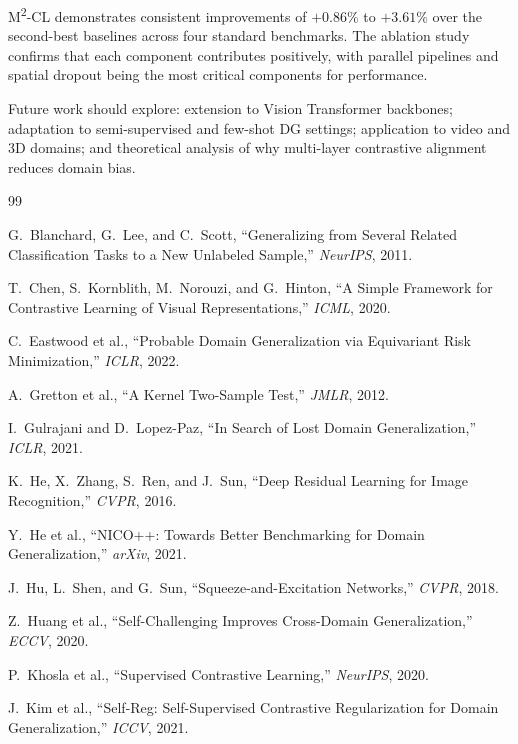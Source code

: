 \documentclass[12pt,a4paper]{article}
\begin{document}
M\textsuperscript{2}-CL demonstrates consistent improvements of $+0.86\%$ to $+3.61\%$
over the second-best baselines across four standard benchmarks. The ablation study
confirms that each component contributes positively, with parallel pipelines and spatial
dropout being the most critical components for performance.

Future work should explore: extension to Vision Transformer backbones; adaptation to
semi-supervised and few-shot DG settings; application to video and 3D domains; and
theoretical analysis of why multi-layer contrastive alignment reduces domain bias.

\newpage
\begin{thebibliography}{99}

G.~Blanchard, G.~Lee, and C.~Scott,
``Generalizing from Several Related Classification Tasks to a New Unlabeled Sample,''
\emph{NeurIPS}, 2011.

T.~Chen, S.~Kornblith, M.~Norouzi, and G.~Hinton,
``A Simple Framework for Contrastive Learning of Visual Representations,''
\emph{ICML}, 2020.

C.~Eastwood et al.,
``Probable Domain Generalization via Equivariant Risk Minimization,''
\emph{ICLR}, 2022.

A.~Gretton et al.,
``A Kernel Two-Sample Test,''
\emph{JMLR}, 2012.

I.~Gulrajani and D.~Lopez-Paz,
``In Search of Lost Domain Generalization,''
\emph{ICLR}, 2021.

K.~He, X.~Zhang, S.~Ren, and J.~Sun,
``Deep Residual Learning for Image Recognition,''
\emph{CVPR}, 2016.

Y.~He et al.,
``NICO++: Towards Better Benchmarking for Domain Generalization,''
\emph{arXiv}, 2021.

J.~Hu, L.~Shen, and G.~Sun,
``Squeeze-and-Excitation Networks,''
\emph{CVPR}, 2018.

Z.~Huang et al.,
``Self-Challenging Improves Cross-Domain Generalization,''
\emph{ECCV}, 2020.

P.~Khosla et al.,
``Supervised Contrastive Learning,''
\emph{NeurIPS}, 2020.

J.~Kim et al.,
``Self-Reg: Self-Supervised Contrastive Regularization for Domain Generalization,''
\emph{ICCV}, 2021.


\end{thebibliography}
\end{document}
